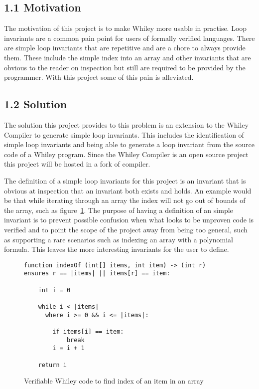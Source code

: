 \documentclass[11pt, a4paper, twoside, openright]{report}
\begin{document}
\subsection*{1.1 Motivation}

The motivation of this project is to make Whiley more usable in practise.
Loop invariants are a common pain point for users of formally verified
languages.
There are simple loop invariants that are repetitive and are a chore to
always provide them.
These include the simple index into an array and other invariants that
are obvious to the reader on inspection but still are required to be
provided by the programmer.
With this project some of this pain is alleviated.


\subsection*{1.2 Solution}

The solution this project provides to this problem is an extension to
the Whiley Compiler to generate simple loop invariants.
This includes the identification of simple loop invariants and being able
to generate a loop invariant from the source code of a Whiley program.
Since the Whiley Compiler is an open source project this project will be
hosted in a fork of compiler.

The definition of a simple loop invariants for this project is an invariant that is
obvious at inspection that an invariant both exists and holds.
An example would be that while iterating through an array the index
will not go out of bounds of the array, such as figure~\ref{lst:whiley-ex-1}.
The purpose of having a definition of an simple invariant is to prevent
possible confusion when what looks to be unproven code is verified and to point
the scope of the project away from being too general, such as supporting
a rare scenarios such as indexing an array with a polynomial formula.
This leaves the more interesting invariants for the user to define.

\begin{figure}[ht]
\begin{lstlisting}
function indexOf (int[] items, int item) -> (int r)
ensures r == |items| || items[r] == item:

    int i = 0

    while i < |items|
      where i >= 0 && i <= |items|:

        if items[i] == item:
            break
        i = i + 1

    return i
\end{lstlisting}
\caption{Verifiable Whiley code to find index of an item in an array}
\label{lst:whiley-ex-1}
\end{figure}
\end{document}
